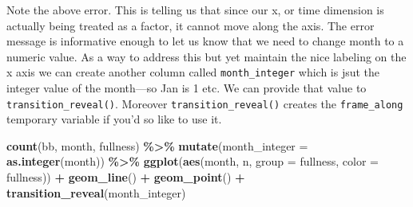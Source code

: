 \documentclass[
]{book}
\newenvironment{Shaded}{\begin{snugshade}}{\end{snugshade}}
\newcommand{\DataTypeTok}[1]{\textcolor[rgb]{0.13,0.29,0.53}{#1}}
\newcommand{\KeywordTok}[1]{\textcolor[rgb]{0.13,0.29,0.53}{\textbf{#1}}}
\newcommand{\NormalTok}[1]{#1}
\newcommand{\OperatorTok}[1]{\textcolor[rgb]{0.81,0.36,0.00}{\textbf{#1}}}
\newcommand{\StringTok}[1]{\textcolor[rgb]{0.31,0.60,0.02}{#1}}
\begin{document}
Note the above error. This is telling us that since our x, or time dimension is actually being treated as a factor, it cannot move along the axis. The error message is informative enough to let us know that we need to change month to a numeric value. As a way to address this but yet maintain the nice labeling on the x axis we can create another column called \texttt{month\_integer} which is jsut the integer value of the month---so Jan is 1 etc. We can provide that value to \texttt{transition\_reveal()}. Moreover \texttt{transition\_reveal()} creates the \texttt{frame\_along} temporary variable if you'd so like to use it.

\begin{Shaded}
\begin{Highlighting}[]
\KeywordTok{count}\NormalTok{(bb, month, fullness) }\OperatorTok{\%\textgreater{}\%}\StringTok{ }
\StringTok{  }\KeywordTok{mutate}\NormalTok{(}\DataTypeTok{month\_integer =} \KeywordTok{as.integer}\NormalTok{(month)) }\OperatorTok{\%\textgreater{}\%}\StringTok{ }
\StringTok{  }\KeywordTok{ggplot}\NormalTok{(}\KeywordTok{aes}\NormalTok{(month, n, }\DataTypeTok{group =}\NormalTok{ fullness, }\DataTypeTok{color =}\NormalTok{ fullness)) }\OperatorTok{+}
\StringTok{  }\KeywordTok{geom\_line}\NormalTok{() }\OperatorTok{+}\StringTok{ }
\StringTok{  }\KeywordTok{geom\_point}\NormalTok{() }\OperatorTok{+}
\StringTok{  }\KeywordTok{transition\_reveal}\NormalTok{(month\_integer)}
\end{Highlighting}
\end{Shaded}
\end{document}
